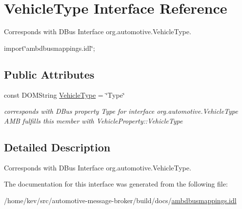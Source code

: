 \hypertarget{interfaceVehicleType}{\section{Vehicle\+Type Interface Reference}
\label{interfaceVehicleType}
}


Corresponds with D\+Bus Interface org.\+automotive.\+Vehicle\+Type.  




{\ttfamily import\char`\"{}ambdbusmappings.\+idl\char`\"{};}

\subsection*{Public Attributes}
\begin{DoxyCompactItemize}
\item 
\hypertarget{interfaceVehicleType_a281e3242c227956a5497d0b1dd685cc6}{const D\+O\+M\+String \hyperlink{interfaceVehicleType_a281e3242c227956a5497d0b1dd685cc6}{Vehicle\+Type} = \char`\"{}Type\char`\"{}}\label{interfaceVehicleType_a281e3242c227956a5497d0b1dd685cc6}

\begin{DoxyCompactList}\small\item\em corresponds with D\+Bus property Type for interface org.\+automotive.\+Vehicle\+Type A\+M\+B fulfills this member with Vehicle\+Property\+::\+Vehicle\+Type \end{DoxyCompactList}\end{DoxyCompactItemize}


\subsection{Detailed Description}
Corresponds with D\+Bus Interface org.\+automotive.\+Vehicle\+Type. 

The documentation for this interface was generated from the following file\+:\begin{DoxyCompactItemize}
\item 
/home/kev/src/automotive-\/message-\/broker/build/docs/\hyperlink{ambdbusmappings_8idl}{ambdbusmappings.\+idl}\end{DoxyCompactItemize}

